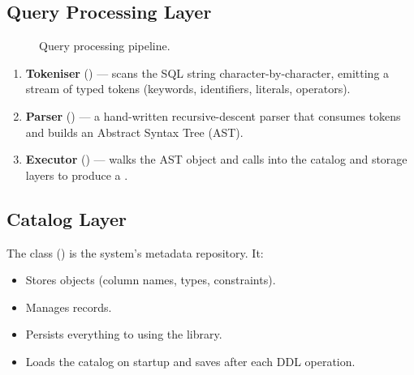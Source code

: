 \subsection{Query Processing Layer}

\begin{figure}[H]
\centering
{}
\caption{Query processing pipeline.}
\label{fig:query-pipeline}
\end{figure}

\begin{enumerate}[nosep]
  \item \textbf{Tokeniser} () --- scans the SQL string character-by-character, emitting a stream of typed tokens (keywords, identifiers, literals, operators).
  \item \textbf{Parser} () --- a hand-written recursive-descent parser that consumes tokens and builds an Abstract Syntax Tree (AST).
  \item \textbf{Executor} () --- walks the AST object and calls into the catalog and storage layers to produce a .
\end{enumerate}

\subsection{Catalog Layer}

The  class () is the system's metadata repository.  It:
\begin{itemize}[nosep]
  \item Stores  objects (column names, types, constraints).
  \item Manages  records.
  \item Persists everything to  using the  library.
  \item Loads the catalog on startup and saves after each DDL operation.
\end{itemize}

